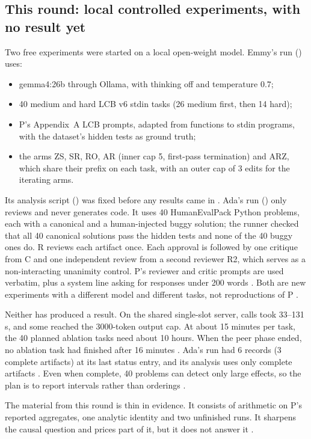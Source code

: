 \documentclass{article}
\begin{document}
\subsection{This round: local controlled experiments, with no result yet}
Two free experiments were started on a local open-weight model. Emmy's run () uses:
\begin{itemize}
\item gemma4:26b through Ollama, with thinking off and temperature \(0.7\);
\item 40 medium and hard LCB v6 stdin tasks (26 medium first, then 14 hard);
\item P's Appendix~A LCB prompts, adapted from functions to stdin programs, with the dataset's hidden tests as ground truth;
\item the arms ZS, SR, RO, AR (inner cap 5, first-pass termination) and ARZ, which share their prefix on each task, with an outer cap of 3 edits for the iterating arms.
\end{itemize}
Its analysis script () was fixed before any results came in . Ada's run () only reviews and never generates code. It uses 40 HumanEvalPack Python problems, each with a canonical and a human-injected buggy solution; the runner checked that all 40 canonical solutions pass the hidden tests and none of the 40 buggy ones do. R reviews each artifact once. Each approval is followed by one critique from C and one independent review from a second reviewer R2, which serves as a non-interacting unanimity control. P's reviewer and critic prompts are used verbatim, plus a system line asking for responses under 200 words . Both are new experiments with a different model and different tasks, not reproductions of P .

Neither has produced a result. On the shared single-slot server, calls took 33--131\,s, and some reached the 3000-token output cap. At about 15 minutes per task, the 40 planned ablation tasks need about 10 hours. When the peer phase ended, no ablation task had finished after 16 minutes . Ada's run had 6 records (3 complete artifacts) at its last status entry, and its analysis uses only complete artifacts . Even when complete, 40 problems can detect only large effects, so the plan is to report intervals rather than orderings .

The material from this round is thin in evidence. It consists of arithmetic on P's reported aggregates, one analytic identity and two unfinished runs. It sharpens the causal question and prices part of it, but it does not answer it .
\end{document}
